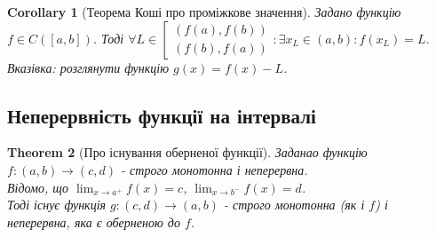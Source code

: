 \documentclass[a4paper, 14pt]{article}
\def\huge{\displaystyle}
\theoremstyle{theoremdd}
\newtheorem{theorem}{Theorem}[subsection]
\theoremstyle{theoremdd}
\theoremstyle{theoremdd}
\theoremstyle{theoremdd}
\theoremstyle{theoremdd}
\theoremstyle{theoremdd}
\theoremstyle{theoremdd}
\theoremstyle{theoremdd}
\newtheorem{corollary}[theorem]{Corollary}
\begin{document}
\begin{corollary}[Теорема Коші про проміжкове значення]
Задано функцію $f \in C([a,b])$.
Тоді $\forall L \in \left[ \begin{gathered} (f(a),f(b)) \\ (f(b),f(a)) \end{gathered} \right.: \exists x_L \in (a,b): f(x_L) = L$.\\
\textit{Вказівка: розглянути функцію $g(x) = f(x) - L$.}
\end{corollary}

\subsection{Неперервність функції на інтервалі}
\begin{theorem}[Про існування оберненої функції]
Заданао функцію $f: (a,b) \to (c,d)$ - строго монотонна і неперервна.\\
Відомо, що $\huge \lim_{x \to a^+} f(x) = c$, $\huge \lim_{x \to b^-} f(x) = d$.\\
Тоді існує функція $g: (c,d) \to (a,b)$ - строго монотонна (як і $f$) і неперервна, яка є оберненою до $f$.
\end{theorem}
\end{document}
